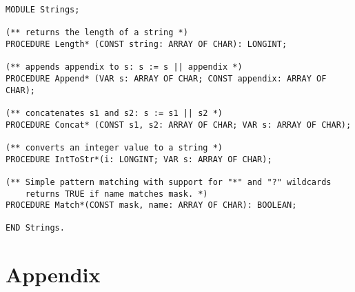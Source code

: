 \documentclass[a4paper,11pt]{article}
\begin{document}
\begin{lstlisting}[language=Oberon,frame=none,caption={Strings}]
MODULE Strings;

(** returns the length of a string *)
PROCEDURE Length* (CONST string: ARRAY OF CHAR): LONGINT;

(** appends appendix to s: s := s || appendix *)
PROCEDURE Append* (VAR s: ARRAY OF CHAR; CONST appendix: ARRAY OF CHAR);

(** concatenates s1 and s2: s := s1 || s2 *)
PROCEDURE Concat* (CONST s1, s2: ARRAY OF CHAR; VAR s: ARRAY OF CHAR);

(** converts an integer value to a string *)
PROCEDURE IntToStr*(i: LONGINT; VAR s: ARRAY OF CHAR);

(** Simple pattern matching with support for "*" and "?" wildcards
    returns TRUE if name matches mask. *)
PROCEDURE Match*(CONST mask, name: ARRAY OF CHAR): BOOLEAN;

END Strings.
\end{lstlisting}


\appendix
\section{Appendix}
\end{document}
